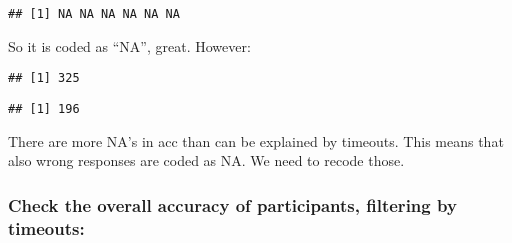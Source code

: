 \documentclass[
]{article}
\newenvironment{Shaded}{\begin{snugshade}}{\end{snugshade}}
\newcommand{\CommentTok}[1]{\textcolor[rgb]{0.56,0.35,0.01}{\textit{#1}}}
\newcommand{\DataTypeTok}[1]{\textcolor[rgb]{0.13,0.29,0.53}{#1}}
\newcommand{\DecValTok}[1]{\textcolor[rgb]{0.00,0.00,0.81}{#1}}
\newcommand{\KeywordTok}[1]{\textcolor[rgb]{0.13,0.29,0.53}{\textbf{#1}}}
\newcommand{\NormalTok}[1]{#1}
\newcommand{\OperatorTok}[1]{\textcolor[rgb]{0.81,0.36,0.00}{\textbf{#1}}}
\newcommand{\StringTok}[1]{\textcolor[rgb]{0.31,0.60,0.02}{#1}}
\begin{document}
\begin{verbatim}
## [1] NA NA NA NA NA NA
\end{verbatim}

So it is coded as ``NA'', great. However:

\begin{Shaded}
\end{Shaded}

\begin{verbatim}
## [1] 325
\end{verbatim}

\begin{Shaded}
\end{Shaded}

\begin{verbatim}
## [1] 196
\end{verbatim}

There are more NA's in acc than can be explained by timeouts. This means
that also wrong responses are coded as NA. We need to recode those.

\begin{Shaded}
\end{Shaded}

\hypertarget{check-the-overall-accuracy-of-participants-filtering-by-timeouts}{%
\subsubsection{Check the overall accuracy of participants, filtering by
timeouts:}\label{check-the-overall-accuracy-of-participants-filtering-by-timeouts}}

\begin{Shaded}
\end{Shaded}
\end{document}
